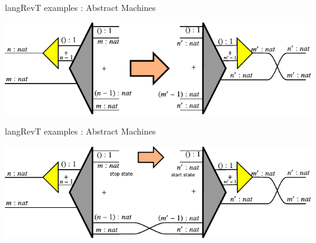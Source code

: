 \documentclass[svgnames,11pt]{beamer}
\begin{document}
\begin{frame}{ {{langRevT}} examples : Abstract Machines}

  \begin{multicols}{2}
    

  \end{multicols}


\vfill

\begin{center}
  \includegraphics{iso-int/diagrams/nat-nat4.pdf}
\end{center}

  
\vfill

\end{frame}

\begin{frame}{ {{langRevT}} examples : Abstract Machines}

  \begin{multicols}{2}
    

  \end{multicols}


\vfill

\begin{center}
  \includegraphics{iso-int/diagrams/nat-nat5.pdf}
\end{center}

  
\vfill

\end{frame}
\end{document}
